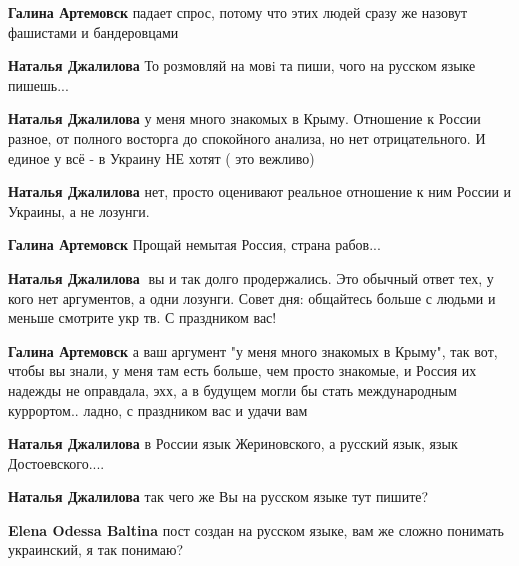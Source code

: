 \begin{itemize}
\begin{itemize}
\textbf{Галина Артемовск} падает спрос, потому что этих людей сразу же назовут фашистами и бандеровцами

\textbf{Наталья Джалилова}
То розмовляй на мовi та пиши, чого на русском языке пишешь...

\textbf{Наталья Джалилова} у меня много знакомых в Крыму. Отношение к России
разное, от полного восторга до спокойного анализа, но нет отрицательного. И
единое у всё - в Украину НЕ хотят ( это вежливо\Smiley[1.0][yellow])

\textbf{Наталья Джалилова} нет, просто оценивают реальное отношение к ним России и Украины, а не лозунги.

\textbf{Галина Артемовск} Прощай немытая Россия, страна рабов...

\textbf{Наталья Джалилова} 🤣вы и так долго продержались. Это обычный ответ
тех, у кого нет аргументов, а одни лозунги. Совет дня: общайтесь больше с
людьми и меньше смотрите укр тв. С праздником вас!

\textbf{Галина Артемовск} а ваш аргумент "у меня много знакомых в Крыму", так
вот, чтобы вы знали, у меня там есть больше, чем просто знакомые, и Россия их
надежды не оправдала, эхх, а в будущем могли бы стать международным куррортом..
ладно, с праздником вас и удачи вам


\textbf{Наталья Джалилова} в России язык Жериновского, а русский язык, язык Достоевского....

\textbf{Наталья Джалилова} так чего же Вы на русском языке тут пишите?

\textbf{Elena Odessa Baltina} пост создан на русском языке, вам же сложно
понимать украинский, я так понимаю?


\end{itemize}
\end{itemize}
